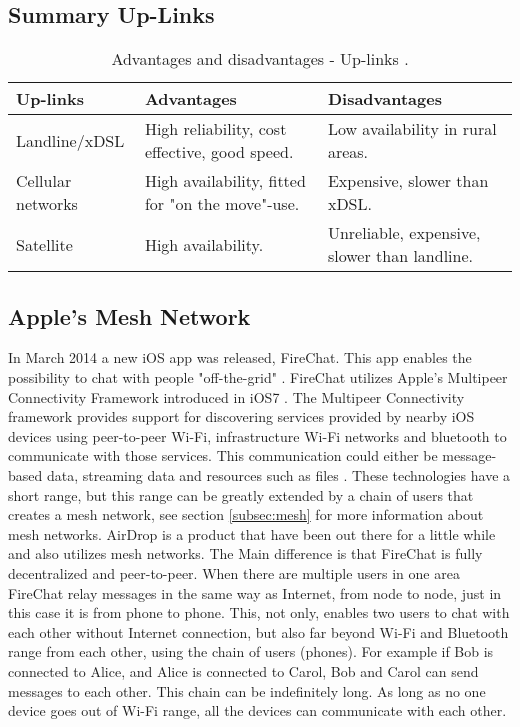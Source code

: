 \subsection{Summary Up-Links}

\begin{center}
\begin{table}[!h]
\caption{\label{tab:uplinks}Advantages and disadvantages - Up-links \cite{comparisonuplinks}.}
    \begin{tabular}{ | l | p{4cm} | p{5cm} |}
    \hline
    \textbf{Up-links} & \textbf{Advantages} & \textbf{Disadvantages} \\ 
    \hline
    Landline/xDSL & High reliability, cost effective, good speed. & Low availability in rural areas. \\ 
    \hline
     Cellular networks & High availability, fitted for "on the move"-use. & Expensive, slower than xDSL.\\
    \hline
    Satellite & High availability.  & Unreliable, expensive, slower than landline.\\ 
    \hline
    \end{tabular}
   \end{table}
\end{center}


\subsection{Apple's Mesh Network}
In March 2014 a new iOS app was released, FireChat. This app enables the possibility to chat with people "off-the-grid" \cite{fireChat}. FireChat utilizes Apple's Multipeer Connectivity Framework introduced in iOS7 \cite{appleMesh}. The Multipeer Connectivity framework provides support for discovering services provided by nearby iOS devices using peer-to-peer Wi-Fi, infrastructure Wi-Fi networks and bluetooth to communicate with those services. This communication could either be message-based data, streaming data and resources such as files \cite{multipeer}. These technologies have a short range, but this range can be greatly extended by a chain of users that creates a mesh network, see section \ref{subsec:mesh} for more information about mesh networks. AirDrop is a product that have been out there for a little while and also utilizes mesh networks. The Main difference is that FireChat is fully decentralized and peer-to-peer. When there are multiple users in one area FireChat relay messages in the same way as Internet, from node to node, just in this case it is from phone to phone.  This, not only, enables two users to chat with each other without Internet connection, but also far beyond Wi-Fi and Bluetooth range from each other, using the chain of users (phones). For example if Bob is connected to Alice, and Alice is connected to Carol, Bob and Carol can send messages to each other. This chain can be indefinitely long. As long as no one device goes out of Wi-Fi range, all the devices can communicate with each other. 

